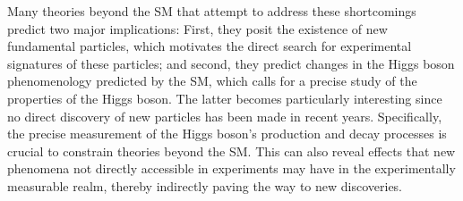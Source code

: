 Many theories beyond the SM that attempt to address these shortcomings predict two major implications: First, they posit the existence of new fundamental particles, which motivates the direct search for experimental signatures of these particles; and second, they predict changes in the Higgs boson phenomenology predicted by the SM, which calls for a precise study of the properties of the Higgs boson. 
The latter becomes particularly interesting since no direct discovery of new particles has been made in recent years. 
Specifically, the precise measurement of the Higgs boson's production and decay processes is crucial to constrain theories beyond the SM. 
This can also reveal effects that new phenomena not directly accessible in experiments may have in the experimentally measurable realm, thereby indirectly paving the way to new discoveries. 


